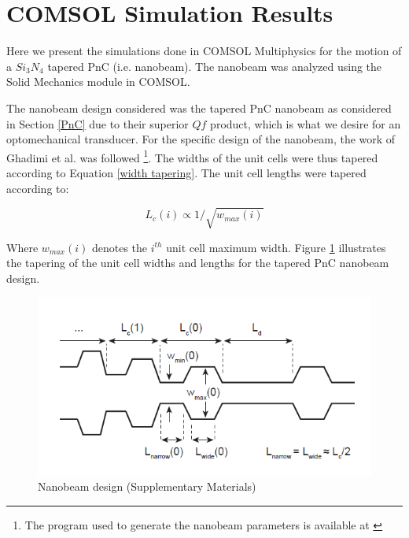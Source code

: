 \documentclass[%
 reprint,
nofootinbib,
 amsmath,amssymb,
 aps,
]{revtex4-2}
\begin{document}


\section{COMSOL Simulation Results}\label{COMSOL results}
Here we present the simulations done in COMSOL Multiphysics for the motion of a $Si_{3}N_{4}$ tapered PnC (i.e. nanobeam). The nanobeam was analyzed using the Solid Mechanics module in COMSOL. 
\newline

The nanobeam design considered was the tapered PnC nanobeam as considered in Section \ref{PnC} due to their superior $Qf$ product, which is what we desire for an optomechanical transducer. For the specific design of the nanobeam, the work of Ghadimi et al. \cite{generalized_dissipation_dilution, ghadimi_main_paper} was followed \footnote{The program used to generate the nanobeam parameters is available at \cite{ruchir_nanobeam_program}}. The widths of the unit cells were thus tapered according to Equation \ref{width tapering}. The unit cell lengths were tapered according to:

\begin{equation*}
    L_{c}(i) \propto 1 / \sqrt{w_{max}(i)}
\end{equation*}

Where $w_{max}(i)$ denotes the $i^{th}$ unit cell maximum width. Figure \ref{fig:unitcell_design} illustrates the tapering of the unit cell widths and lengths for the tapered PnC nanobeam design.

\begin{figure}[H]
    \centering
    \includegraphics[width = \columnwidth]{unitcell_design.PNG}
    \caption{Nanobeam design \cite{generalized_dissipation_dilution} (Supplementary Materials)}
    \label{fig:unitcell_design}
\end{figure}
\end{document}
